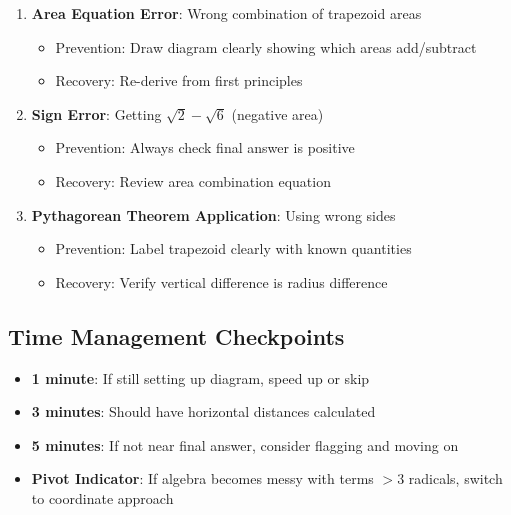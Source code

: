 \documentclass[]{article}
\begin{document}
\begin{solutionbox}
\begin{enumerate}[leftmargin=*]
    \item \textbf{Area Equation Error}: Wrong combination of trapezoid areas
    \begin{itemize}
        \item Prevention: Draw diagram clearly showing which areas add/subtract
        \item Recovery: Re-derive from first principles
    \end{itemize}
    
    \item \textbf{Sign Error}: Getting $\sqrt{2} - \sqrt{6}$ (negative area)
    \begin{itemize}
        \item Prevention: Always check final answer is positive
        \item Recovery: Review area combination equation
    \end{itemize}
    
    \item \textbf{Pythagorean Theorem Application}: Using wrong sides
    \begin{itemize}
        \item Prevention: Label trapezoid clearly with known quantities
        \item Recovery: Verify vertical difference is radius difference
    \end{itemize}
\end{enumerate}

\subsection*{Time Management Checkpoints}
\begin{itemize}[leftmargin=*]
    \item \textbf{1 minute}: If still setting up diagram, speed up or skip
    \item \textbf{3 minutes}: Should have horizontal distances calculated
    \item \textbf{5 minutes}: If not near final answer, consider flagging and moving on
    \item \textbf{Pivot Indicator}: If algebra becomes messy with terms $>3$ radicals, switch to coordinate approach
\end{itemize}
\end{solutionbox}
\end{document}
